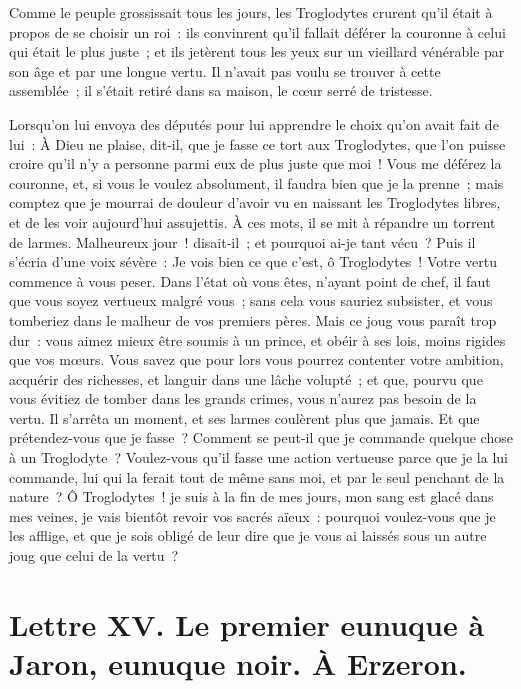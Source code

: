 \documentclass[french,twoside]{book} %
\newcommand{\dateline}[1]{\medskip{\RaggedLeft{#1}\par}\bigskip}
\begin{document}
\noindent Comme le peuple grossissait tous les jours, les Troglodytes crurent qu’il était à propos de se choisir un roi : ils convinrent qu’il fallait déférer la couronne à celui qui était le plus juste ; et ils jetèrent tous les yeux sur un vieillard vénérable par son âge et par une longue vertu. Il n’avait pas voulu se trouver à cette assemblée ; il s’était retiré dans sa maison, le cœur serré de tristesse.\par
Lorsqu’on lui envoya des députés pour lui apprendre le choix qu’on avait fait de lui : À Dieu ne plaise, dit-il, que je fasse ce tort aux Troglodytes, que l’on puisse croire qu’il n’y a personne parmi eux de plus juste que moi ! Vous me déférez la couronne, et, si vous le voulez absolument, il faudra bien que je la prenne ; mais comptez que je mourrai de douleur d’avoir vu en naissant les Troglodytes libres, et de les voir aujourd’hui assujettis. À ces mots, il se mit à répandre un torrent de larmes. Malheureux jour ! disait-il ; et pourquoi ai-je tant vécu ? Puis il s’écria d’une voix sévère : Je vois bien ce que c’est, ô Troglodytes ! Votre vertu commence à vous peser. Dans l’état où vous êtes, n’ayant point de chef, il faut que vous soyez vertueux malgré vous ; sans cela vous sauriez subsister, et vous tomberiez dans le malheur de vos premiers pères. Mais ce joug vous paraît trop dur : vous aimez mieux être soumis à un prince, et obéir à ses lois, moins rigides que vos mœurs. Vous savez que pour lors vous pourrez contenter votre ambition, acquérir des richesses, et languir dans une lâche volupté ; et que, pourvu que vous évitiez de tomber dans les grands crimes, vous n’aurez pas besoin de la vertu. Il s’arrêta un moment, et ses larmes coulèrent plus que jamais. Et que prétendez-vous que je fasse ? Comment se peut-il que je commande quelque chose à un Troglodyte ? Voulez-vous qu’il fasse une action vertueuse parce que je la lui commande, lui qui la ferait tout de même sans moi, et par le seul penchant de la nature ? Ô Troglodytes ! je suis à la fin de mes jours, mon sang est glacé dans mes veines, je vais bientôt revoir vos sacrés aïeux : pourquoi voulez-vous que je les afflige, et que je sois obligé de leur dire que je vous ai laissés sous un autre joug que celui de la vertu ?\par

\dateline{D’Erzeron, le 10 de la lune de Gemmadi 2, 1711.}
\section[{Lettre XV. Le premier eunuque à Jaron, eunuque noir. À Erzeron.}]{Lettre XV. Le premier eunuque à Jaron, eunuque noir. À Erzeron.}\renewcommand{\leftmark}{Lettre XV. Le premier eunuque à Jaron, eunuque noir. À Erzeron.}
\end{document}
